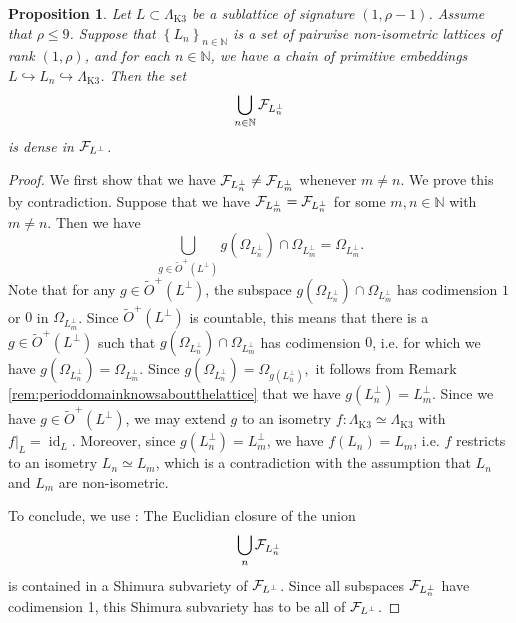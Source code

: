 \documentclass[11pt,twoside]{amsart}
\numberwithin{equation}{section}
\newtheorem{proposition}[dummy]{Proposition}
\theoremstyle{definition}
\theoremstyle{plain}
\newcommand{\klat}{\ensuremath{\Lambda_{\operatorname{K3}}}}
\def\toplus{\ensuremath{\tilde{O}^+}}
\begin{document}
\begin{proposition}\label{prop:densitycorankone}
    Let $L\subset \klat$ be a sublattice of signature $(1,\rho-1)$. Assume that $\rho\leq 9$. Suppose that $\left\{L_n\right\}_{n\in \mathbb{N}}$ is a set of pairwise non-isometric lattices of rank $(1,\rho)$, and for each $n\in \mathbb{N}$, we have a chain of primitive embeddings $L\hookrightarrow L_n\hookrightarrow \klat$.  Then the set $$\bigcup_{n\in \mathbb{N}}\mathcal{F}_{L_n^\perp}$$ is dense in $\mathcal{F}_{L^\perp}$.
\end{proposition}
\begin{proof}
    We first show that we have $\mathcal{F}_{L_n^\perp}\neq \mathcal{F}_{L_m^\perp}$ whenever $m\neq n$. We prove this by contradiction. Suppose that we have $\mathcal{F}_{L_m^\perp} = \mathcal{F}_{L_n^\perp}$ for some $m,n\in \mathbb{N}$ with $m\neq n$. Then we have 
    $$\bigcup_{g\in \toplus(L^\perp)}g(\Omega_{L_n^\perp})\cap \Omega_{L_m^\perp} = \Omega_{L_m^\perp}.$$
    Note that for any $g\in \toplus(L^\perp)$, 
    the subspace $g(\Omega_{L_n^\perp})\cap \Omega_{L_m^\perp}$ has codimension $1$ or $0$ in $\Omega_{L_m^\perp}$. Since $\toplus(L^\perp)$ is countable, 
    this means that there is a $g\in \toplus(L^\perp)$ such that 
    $g(\Omega_{L_n^\perp})\cap\Omega_{L_m^\perp}$ has codimension $0$, i.e. for which we have $g(\Omega_{L_n^\perp}) = \Omega_{L_m^\perp}.$ Since $g(\Omega_{L_n^\perp}) = \Omega_{g(L_n^\perp)},$ it follows from Remark \ref{rem:perioddomainknowsaboutthelattice} that we have $g(L_n^\perp) = L_m^\perp$. Since we have $g\in \toplus(L^\perp)$, we may extend $g$ to an isometry $f: \klat\simeq\klat$ with $f|_L = \operatorname{id}_L$. Moreover, since $g(L_n^\perp) = L_m^\perp$, we have $f(L_n) = L_m$, i.e. $f$ restricts to an isometry $L_n\simeq L_m$, which is a contradiction with the assumption that $L_n$ and $L_m$ are non-isometric. 
    
    To conclude, we use \cite[Theorem 3.8]{MP23}: The Euclidian closure of the union $$\bigcup_n\mathcal{F}_{L_{n}^\perp}$$ is contained in a Shimura subvariety of $\mathcal{F}_{L^\perp}$. Since all subspaces $\mathcal{F}_{L_n^\perp}$ have codimension 1, this Shimura subvariety has to be all of $\mathcal{F}_{L^\perp}$.
\end{proof}
\end{document}
